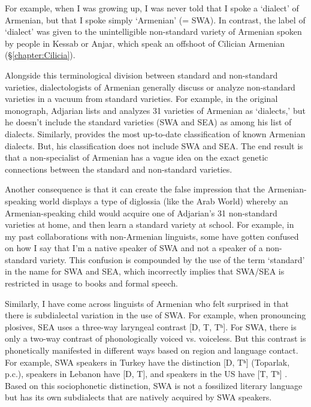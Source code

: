 For example, when I was growing up, I was never told that I spoke a `dialect' of Armenian, but that I spoke simply `Armenian' (= SWA). In contrast, the label of `dialect' was given to the unintelligible non-standard variety of Armenian spoken by people in Kessab or Anjar, which speak an offshoot of Cilician Armenian (\S\ref{chapter:Cilicia}). 



Alongside this terminological division between standard and non-standard varieties, dialectologists of Armenian generally discuss or analyze non-standard varieties in a vacuum from standard varieties. For example, in the original monograph, Adjarian lists and analyzes 31 varieties of Armenian as `dialects,' but he doesn't include the standard varieties (SWA and SEA) as among his list of dialects. Similarly, \citet{Martirosyan-2019-Armeniandialects,Martirosyan-2019-ArmenianDialectsBigVersionRussianJournal} provides the most up-to-date classification of known Armenian dialects. But, his classification does not include SWA and SEA. The end result is that a non-specialist of Armenian has a vague idea on the exact genetic connections between the standard and non-standard varieties. 

Another consequence is that it can create the false impression that the Armenian-speaking world displays a type of diglossia (like the Arab World) whereby an Armenian-speaking child would acquire one of Adjarian's 31 non-standard varieties at home, and then learn a standard variety at school. For example, in my past collaborations with non-Armenian linguists, some have gotten confused on how I say that I'm a native speaker of SWA and not a speaker of a non-standard variety. This confusion is compounded by the use of the  term `standard' in the name for SWA and SEA, which incorrectly implies that SWA/SEA is restricted in usage to books and formal speech. 

Similarly, I have come across linguists of Armenian who felt surprised in that there is subdialectal variation in the use of SWA. For example, when pronouncing plosives, SEA uses a three-way laryngeal contrast [D, T, Tʰ]. For SWA, there is only a two-way contrast of phonologically voiced vs. voiceless. But this contrast is phonetically manifested in different ways based on region and language contact. For example, SWA speakers in Turkey have the distinction [D, Tʰ] (Toparlak, p.c.), speakers in Lebanon have [D, T], and speakers in the US have [T, Tʰ] \citep{kellyKeshishian-2021-VoicingWesternArmenian}. Based on this sociophonetic distinction,    SWA is not a fossilized literary language but has its own subdialects that are natively acquired by SWA speakers.  


